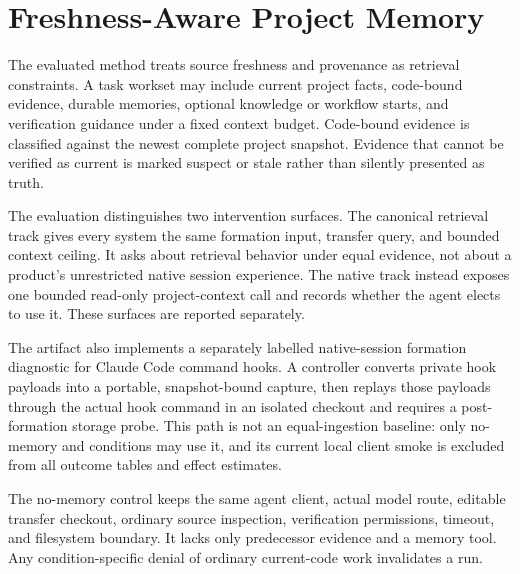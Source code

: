 \section{Freshness-Aware Project Memory}

The evaluated method treats source freshness and provenance as retrieval
constraints. A task workset may include current project facts, code-bound
evidence, durable memories, optional knowledge or workflow starts, and
verification guidance under a fixed context budget. Code-bound evidence is
classified against the newest complete project snapshot. Evidence that cannot be
verified as current is marked suspect or stale rather than silently presented as
truth.

The evaluation distinguishes two intervention surfaces. The canonical retrieval
track gives every system the same formation input, transfer query, and bounded
context ceiling. It asks about retrieval behavior under equal evidence, not
about a product's unrestricted native session experience. The native \memorix{}
track instead exposes one bounded read-only project-context call and records
whether the agent elects to use it. These surfaces are reported separately.

The artifact also implements a separately labelled native-session formation
diagnostic for Claude Code command hooks. A controller converts private hook
payloads into a portable, snapshot-bound capture, then replays those payloads
through the actual \memorix{} hook command in an isolated checkout and requires
a post-formation storage probe. This path is not an equal-ingestion baseline:
only no-memory and \memorix{} conditions may use it, and its current local
client smoke is excluded from all outcome tables and effect estimates.

The no-memory control keeps the same agent client, actual model route, editable
transfer checkout, ordinary source inspection, verification permissions, timeout,
and filesystem boundary. It lacks only predecessor evidence and a memory tool.
Any condition-specific denial of ordinary current-code work invalidates a run.
